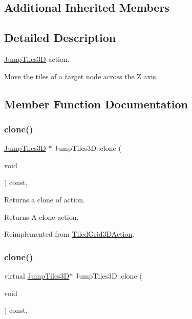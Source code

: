 \subsection*{Additional Inherited Members}


\subsection{Detailed Description}
\hyperlink{classJumpTiles3D}{Jump\+Tiles3D} action. 

Move the tiles of a target node across the Z axis. 

\subsection{Member Function Documentation}
\mbox{\label{classJumpTiles3D_a65989f533d25fd290a6997f63d14072a}} 
\subsubsection{\texorpdfstring{clone()}{clone()}\hspace{0.1cm}{\footnotesize\ttfamily [1/2]}}
{\footnotesize\ttfamily \hyperlink{classJumpTiles3D}{Jump\+Tiles3D} $\ast$ Jump\+Tiles3\+D\+::clone (\begin{DoxyParamCaption}\item[{void}]{ }\end{DoxyParamCaption}) const\hspace{0.3cm}{\ttfamily [override]}, {\ttfamily [virtual]}}

Returns a clone of action.

\begin{DoxyReturn}{Returns}
A clone action. 
\end{DoxyReturn}


Reimplemented from \hyperlink{classTiledGrid3DAction_a689fd377cc0abae91db7def106529b53}{Tiled\+Grid3\+D\+Action}.

\mbox{\label{classJumpTiles3D_a2888c2609ac679b0ba04ade474fa87e6}} 
\subsubsection{\texorpdfstring{clone()}{clone()}\hspace{0.1cm}{\footnotesize\ttfamily [2/2]}}
{\footnotesize\ttfamily virtual \hyperlink{classJumpTiles3D}{Jump\+Tiles3D}$\ast$ Jump\+Tiles3\+D\+::clone (\begin{DoxyParamCaption}\item[{void}]{ }\end{DoxyParamCaption}) const\hspace{0.3cm}{\ttfamily [override]}, {\ttfamily [virtual]}}

